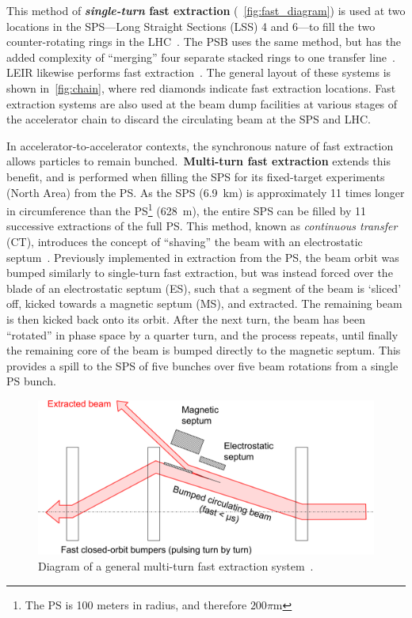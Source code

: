 \documentclass[a4paper,twoside,11pt]{report}
\begin{document}
This method of \textbf{\textit{single-turn} fast extraction} (~\autoref{fig:fast_diagram}) is used at two locations in the SPS---Long Straight Sections (LSS) 4 and 6---to fill the two counter-rotating rings in the LHC~\cite{Fraser:CAS}. The PSB uses the same method, but has the added complexity of ``merging'' four separate stacked rings to one transfer line~\cite{Metzmacher:2061508}. LEIR likewise performs fast extraction~\cite{Ghithan:2017wpd}. The general layout of these systems is shown in~\ref{fig:chain}, where red diamonds indicate fast extraction locations. Fast extraction systems are also used at the beam dump facilities at various stages of the accelerator chain to discard the circulating beam at the SPS and LHC.

In accelerator-to-accelerator contexts, the synchronous nature of fast extraction allows particles to remain bunched.~\textbf{Multi-turn fast extraction} extends this benefit, and is performed when filling the SPS for its fixed-target experiments (North Area) from the PS. As the SPS (\qty{6.9}{km}) is approximately 11 times longer in circumference than the PS\footnote{The PS is 100 meters in radius, and therefore $200\pi$\si{m}} (\qty{628}{m}), the entire SPS can be filled by 11 successive extractions of the full PS. This method, known as \textit{continuous transfer} (CT), introduces the concept of ``shaving'' the beam with an electrostatic septum~\cite{PhysRevSTAB.14.030101}. Previously implemented in extraction from the PS, the beam orbit was bumped similarly to single-turn fast extraction, but was instead forced over the blade of an electrostatic septum (ES), such that a segment of the beam is `sliced' off, kicked towards a magnetic septum (MS), and extracted. The remaining beam is then kicked back onto its orbit. After the next turn, the beam has been ``rotated'' in phase space by a quarter turn, and the process repeats, until finally the remaining core of the beam is bumped directly to the magnetic septum. This provides a spill to the SPS of five bunches over five beam rotations from a single PS bunch.

\begin{figure}[hb]
  \centering
  \includegraphics[width=\linewidth]{fastmulti.png}
  \caption{Diagram of a general multi-turn fast extraction system~\cite{Fraser:CAS}.}\label{fig:fast_multi_diagram}
\end{figure}
\end{document}
